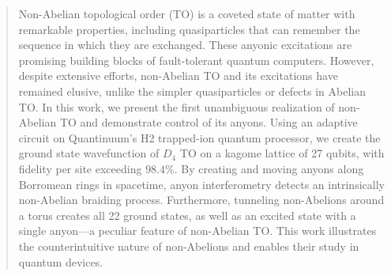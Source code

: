 \documentclass[nofootinbib,pra,twocolumn,showpacs,superscriptaddress,notitlepage,amsmath]{revtex4-2} %
\begin{document}
\begin{abstract}
Non-Abelian topological order (TO) is a coveted state of matter with remarkable properties, including quasiparticles that can remember the sequence in which they are exchanged. These anyonic excitations are promising building blocks of fault-tolerant quantum computers. However, despite extensive efforts, non-Abelian TO and its excitations have remained elusive, unlike the simpler quasiparticles or defects in Abelian TO. In this work, we present the first unambiguous realization of non-Abelian TO and demonstrate control of its anyons. Using an adaptive circuit on Quantinuum's H2 trapped-ion quantum processor, we create the ground state wavefunction of $D_4$ TO on a kagome lattice of 27 qubits, with fidelity per site exceeding $98.4\%$. By creating and moving anyons along Borromean rings in spacetime, anyon interferometry detects an intrinsically non-Abelian braiding process. Furthermore, tunneling non-Abelions around a torus creates all 22 ground states, as well as an excited state with a single anyon---a peculiar feature of non-Abelian TO. This work illustrates the counterintuitive nature of non-Abelions and enables their study in quantum devices.
\end{abstract}
\end{document}
